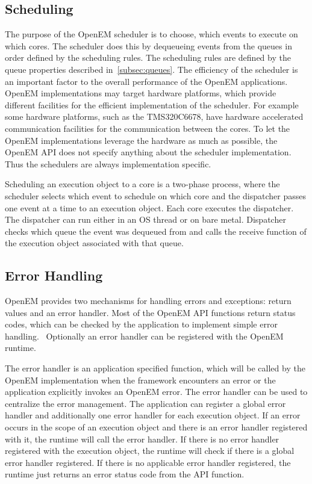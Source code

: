 \subsection{Scheduling}
\label{subsec:schedule}
The purpose of the OpenEM scheduler is to choose, which events to execute on which cores. The scheduler does this by dequeueing events from the queues in order defined by the scheduling rules. The scheduling rules are defined by the queue properties described in~\ref{subsec:queues}. The efficiency of the scheduler is an important factor to the overall performance of the OpenEM applications.~\cite{openempage} OpenEM implementations may target hardware platforms, which provide different facilities for the efficient implementation of the scheduler. For example some hardware platforms, such as the TMS320C6678, have hardware accelerated communication facilities for the communication between the cores. To let the OpenEM implementations leverage the hardware as much as possible, the OpenEM API does not specify anything about the scheduler implementation. Thus the schedulers are always implementation specific.

Scheduling an execution object to a core is a two-phase process, where the scheduler selects which event to schedule on which core and the dispatcher passes one event at a time to an execution object. Each core executes the dispatcher. The dispatcher can run either in an OS thread or on bare metal. Dispatcher checks which queue the event was dequeued from and calls the receive function of the execution object associated with that queue.~\cite{openemintro}

\subsection{Error Handling}
\label{subsec:error}
OpenEM provides two mechanisms for handling errors and exceptions: return values and an error handler. Most of the OpenEM API functions return status codes, which can be checked by the application to implement simple error handling.~\cite{openempage} Optionally an error handler can be registered with the OpenEM runtime.

The error handler is an application specified function, which will be called by the OpenEM implementation when the framework encounters an error or the application explicitly invokes an OpenEM error. The error handler can be used to centralize the error management. The application can register a global error handler and additionally one error handler for each execution object. If an error occurs in the scope of an execution object and there is an error handler registered with it, the runtime will call the error handler. If there is no error handler registered with the execution object, the runtime will check if there is a global error handler registered. If there is no applicable error handler registered, the runtime just returns an error status code from the API function.~\cite{openempage}

